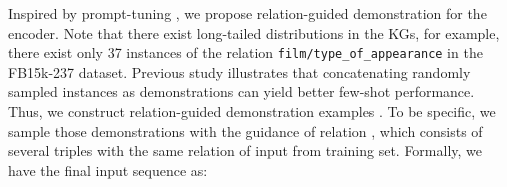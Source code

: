 \documentclass[sigconf]{acmart}
\begin{document}
Inspired by prompt-tuning \cite{DBLP:journals/corr/abs-2108-13161}, we propose relation-guided demonstration for the encoder. 
Note that there exist long-tailed distributions in the KGs, for example, there  exist only 37 instances of the relation \texttt{film/type\_of\_appearance} in the FB15k-237 dataset.
Previous study \cite{DBLP:journals/corr/abs-2108-13161} illustrates that concatenating  randomly sampled instances as demonstrations can yield better few-shot performance.
Thus, we construct relation-guided demonstration examples .
To be specific, we sample those demonstrations with the guidance of relation , which consists of several triples with the same relation of input from training set.
Formally, we have the final input sequence as:


\begin{table*}[!ht]


\end{table*}
\end{document}
